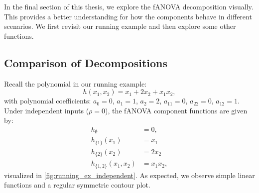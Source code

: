 In the final section of this thesis, we explore the fANOVA decomposition visually. This provides a better understanding for how the components behave in different scenarios. We first revisit our running example and then explore some other functions.
\subsection{Comparison of Decompositions}
Recall the polynomial in our running example:
\[
h(x_1, x_2) = x_1 + 2 x_2 + x_1 x_2,
\]
with polynomial coefficients: $a_0 = 0$, $a_1 = 1$, $a_2 = 2$, $a_{11} = 0$, $a_{22} = 0$, $a_{12} = 1$.
Under independent inputs ($\rho = 0$), the fANOVA component functions are given by:
\begin{align*}
h_{\emptyset} &= 0, \\
h_{\{1\}}(x_1) &= x_1\\
h_{\{2\}}(x_2) &= 2x_2\\
h_{\{1,2\}}(x_1, x_2) &= x_1x_2,
\end{align*}
visualized in \autoref{fig:running_ex_independent}. As expected, we observe simple linear functions and a regular symmetric contour plot.
